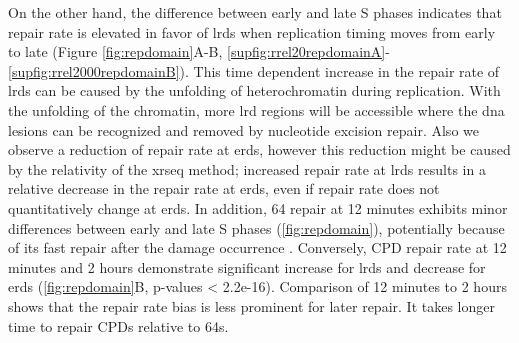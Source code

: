 On the other hand, the difference between early and late S phases indicates that repair rate is elevated in favor of \gls{lrd}s when replication timing moves from early to late (Figure \ref{fig:repdomain}A-B, \ref{supfig:rrel20repdomainA}-\ref{supfig:rrel2000repdomainB}). This time dependent increase in the repair rate of \gls{lrd}s can be caused by the unfolding of heterochromatin during replication. With the unfolding of the chromatin, more \gls{lrd} regions will be accessible where the \gls{dna} lesions can be recognized and removed by nucleotide excision repair. Also we observe a reduction of repair rate at \gls{erd}s, however this reduction might be caused by the relativity of the \gls{xrseq} method; increased repair rate at \gls{lrd}s results in a relative decrease in the repair rate at \gls{erd}s, even if repair rate does not quantitatively change at \gls{erd}s. In addition, \gls{64} repair at 12 minutes exhibits minor differences between early and late S phases (\ref{fig:repdomain}), potentially because of its fast repair after the damage occurrence \citep{hu2017dynamic}. Conversely, \gls{CPD} repair rate at 12 minutes and 2 hours demonstrate significant increase for \gls{lrd}s and decrease for \gls{erd}s (\ref{fig:repdomain}B, p-values < 2.2e-16). Comparison of 12 minutes to 2 hours shows that the repair rate bias is less prominent for later repair. It takes longer time to repair \gls{CPD}s relative to \gls{64}s.

